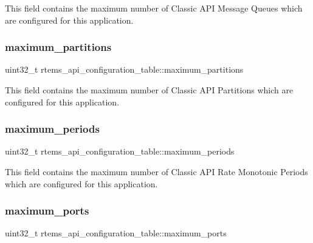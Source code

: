 This field contains the maximum number of Classic A\+PI Message Queues which are configured for this application. \mbox{\label{structrtems__api__configuration__table_a5f6a3407f0b9e27067bde4743f52fbc5}} 
\subsubsection{\texorpdfstring{maximum\_partitions}{maximum\_partitions}}
{\footnotesize\ttfamily uint32\+\_\+t rtems\+\_\+api\+\_\+configuration\+\_\+table\+::maximum\+\_\+partitions}

This field contains the maximum number of Classic A\+PI Partitions which are configured for this application. \mbox{\label{structrtems__api__configuration__table_a851efb35106dca09e0fc15794ef70e02}} 
\subsubsection{\texorpdfstring{maximum\_periods}{maximum\_periods}}
{\footnotesize\ttfamily uint32\+\_\+t rtems\+\_\+api\+\_\+configuration\+\_\+table\+::maximum\+\_\+periods}

This field contains the maximum number of Classic A\+PI Rate Monotonic Periods which are configured for this application. \mbox{\label{structrtems__api__configuration__table_a120ba454da6de3ede01da0b185ffb5a7}} 
\subsubsection{\texorpdfstring{maximum\_ports}{maximum\_ports}}
{\footnotesize\ttfamily uint32\+\_\+t rtems\+\_\+api\+\_\+configuration\+\_\+table\+::maximum\+\_\+ports}

